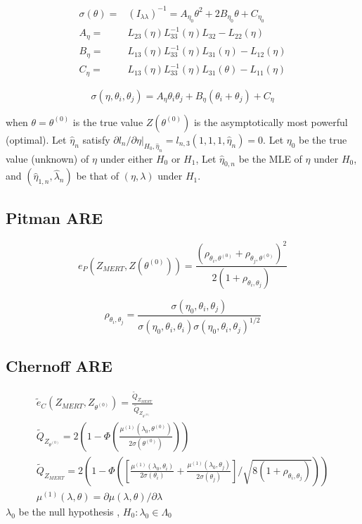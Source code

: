 \documentclass{article}
\begin{document}
\begin{align*}
\sigma(\theta) =& (I_{\lambda\lambda})^{-1}=A_{\eta_0}\theta^2+2B_{\eta_0}\theta+C_{\eta_0}\\
 A_\eta =& L_{23}(\eta)L_{33}^{-1}(\eta)L_{32}-L_{22}(\eta)\\
 B_\eta =& L_{13}(\eta)L_{33}^{-1}(\eta)L_{31}(\eta)-L_{12}(\eta)\\
 C_\eta =& L_{13}(\eta)L_{33}^{-1}(\eta)L_{31}(\theta)-L_{11}(\eta)
\end{align*}

$$\sigma(\eta,\theta_i,\theta_j) =A_{\eta}\theta_i\theta_j+B_{\eta}(\theta_i+\theta_j)+C_{\eta}$$

when $\theta = \theta^{(0)}$ is the true value $Z(\theta^{(0)})$ is the asymptotically most powerful (optimal). Let $\hat{\eta}_n$  satisfy $\partial l_n/\partial \eta|_{H_0,\hat{\eta}_n}= l_{n,3}(1,1,1,\hat{\eta}_n)=0$. Let $\eta_0$ be the true value (unknown) of $\eta$ under either $H_0$ or $H_1$, Let $\hat{\eta}_{0,n}$  be the MLE of $\eta$ under $H_0$, and $(\hat{\eta}_{1,n}, \hat{\lambda}_n)$  be that of $(\eta,\lambda)$ under $H_1$.  

\subsection{Pitman ARE}

$$e_P(Z_{MERT},Z(\theta^{(0)}))=\frac{(\rho_{\theta_i,\theta^{(0)}}+\rho_{\theta_j,\theta^{(0)}})^2}{2(1+\rho_{\theta_i,\theta_j})}$$

$$\rho_{\theta_i,\theta_j}= \frac{\sigma(\eta_0,\theta_i,\theta_j)}{{\sigma(\eta_0,\theta_i,\theta_i)\sigma(\eta_0,\theta_i,\theta_j)}^{1/2}}$$


\subsection{Chernoff ARE}


\begin{align*}
\tilde{e}_C(Z_{MERT},Z_{\theta^{(0)}})= \frac{ \tilde{Q}_{Z_{MERT}}}{\tilde{Q}_{Z_{\theta^{(0)}}}}\\
\tilde{Q}_{Z_{\theta^{(0)}}} =  2\left(1-\Phi\left(\frac{\mu^{(1)}(\lambda_0,\theta^{(0)})}{2\sigma(\theta^{(0)})}\right)\right)\\
\tilde{Q}_{Z_{MERT}} =  2\left(1-\Phi\left(\left[\frac{\mu^{(1)}(\lambda_0,\theta_i)}{2\sigma(\theta_i)}+\frac{\mu^{(1)}(\lambda_0,\theta_j)}{2\sigma(\theta_j)}\right]/\sqrt{8(1+\rho_{\theta_i,\theta_j})}\right)\right)\\
\mu^{(1)}(\lambda,\theta) = \partial \mu(\lambda,\theta)/\partial\lambda
\end{align*}
$\lambda_0 $  be the null hypothesis , $H_0: \lambda_0 \in \Lambda_0$
\end{document}
